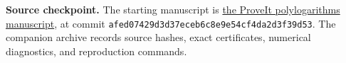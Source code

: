 \documentclass[11pt,a4paper]{article}
\numberwithin{equation}{section}
\theoremstyle{plain}
\theoremstyle{definition}
\theoremstyle{remark}
\newcommand{\code}[1]{\nolinkurl{#1}}
\begin{document}
\noindent\textbf{Source checkpoint.}
The starting manuscript is
\href{https://github.com/VladimirReshetnikov/ProveIt/tree/afed07429d3d37eceb6c8e9e54cf4da2d3f39d53/Analysis/Polylogarithms/docs/manuscript}
{the ProveIt polylogarithms manuscript},
at commit \code{afed07429d3d37eceb6c8e9e54cf4da2d3f39d53}.
The companion archive records source hashes, exact certificates,
numerical diagnostics, and reproduction commands.

\newpage
{\small\setlength{\parskip}{0pt}\tableofcontents}
\newpage









\end{document}
